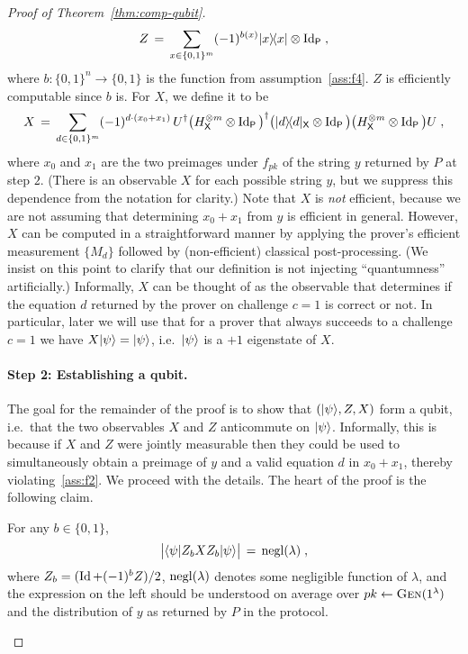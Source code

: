 \begin{proof}[Proof of Theorem~\ref{thm:comp-qubit}]
\begin{equation}
Z \,=\, \sum_{x\in\{0,1\}^m} (-1)^{b(x)} |x\rangle\!\langle x| \otimes \mathop{\rm Id}\nolimits_{\textsf{P}}\;,
\end{equation}
where $b:\{0,1\}^n\to\{0,1\}$ is the function from assumption~\ref{ass:f4}. 
$Z$ is efficiently computable since $b$ is. For $X$, we define it to be 
\begin{equation}\label{eq:comp-qubit-proof-1b}
 X\,=\, \sum_{d\in\{0,1\}^m} (-1)^{d\cdot(x_0+x_1)}\,  U^\dagger \big(H^{\otimes m}_{\textsf{X}}\otimes \mathop{\rm Id}\nolimits_{\textsf{P}}\big)^\dagger \big(|d\rangle\!\langle d|_{\textsf{X}} \otimes \mathop{\rm Id}\nolimits_{\textsf{P}} \big)\big(H^{\otimes m}_{\textsf{X}}\otimes \mathop{\rm Id}\nolimits_{\textsf{P}}\big) U\;,
\end{equation}
where $x_0$ and $x_1$ are the two preimages under $f_{pk}$ of the string $y$ returned by $P$ at step $2$. (There is an observable $X$ for each possible string $y$, but we suppress this dependence from the notation for clarity.) Note that $X$ is \emph{not} efficient, because we are not assuming that determining $x_0+x_1$ from $y$ is efficient in general. However, $X$ can be computed in a straightforward manner by applying the prover's efficient measurement $\{M_d\}$ followed by (non-efficient) classical post-processing. (We insist on this point to clarify that our definition is not injecting ``quantumness'' artificially.) Informally, $X$ can be thought of as the observable that determines if the equation $d$ returned by the prover on challenge $c=1$ is correct or not. In particular, later we will use that for a prover that always succeeds to a challenge $c=1$ we have $X|\psi\rangle = |\psi\rangle$, i.e.\ $|\psi\rangle$ is a $+1$ eigenstate of $X$. 

\paragraph{Step 2: Establishing a qubit.} The goal for the remainder of the proof is to show that $(|\psi\rangle,Z,X)$ form a qubit, i.e.\ that the two observables $X$ and $Z$ anticommute on $|\psi\rangle$. Informally, this is because if $X$ and $Z$ were jointly measurable then they could be used to simultaneously obtain a preimage of $y$ and a valid equation $d$ in $x_0+ x_1$, thereby violating~\ref{ass:f2}. We proceed with the details.  
The heart of the proof is the following claim. 

\begin{claim}\label{claim:comp-qubit-1}
For any $b\in \{0,1\}$, 
\[\big| \langle\psi| Z_b X Z_b |\psi\rangle \big| \,=\, \operatorname{negl}(\lambda) \;,\]
where $Z_b = (\mathop{\rm Id}\nolimits + (-1)^b Z)/2$, $\operatorname{negl}(\lambda)$ denotes some negligible function of $\lambda$, and the expression on the left should be understood on average over $pk\leftarrow \textsc{Gen}(1^\lambda)$ and the distribution of $y$ as returned by $P$ in the protocol. 
\end{claim}


\end{proof}
